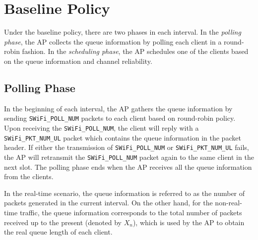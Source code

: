 \documentclass{article}
\begin{document}
\section{Baseline Policy}
\label{section: baseline}


\frenchspacing  Under the baseline policy, there are two phases in each interval. In the \emph{polling phase}, the AP collects the queue information by polling each client in a round-robin fashion. In the \emph{scheduling phase}, the AP schedules one of the clients based on the queue information and channel reliability.

\subsection{Polling Phase}
In the beginning of each interval, the AP gathers the queue information by sending \lstinline|SWiFi_POLL_NUM| packets to each client based on round-robin policy. Upon receiving the \lstinline|SWiFi_POLL_NUM|, the client will reply with a \lstinline|SWiFi_PKT_NUM_UL| packet which contains the queue information in the packet header. If either the transmission of \lstinline|SWiFi_POLL_NUM| or \lstinline|SWiFi_PKT_NUM_UL| fails, the AP will retransmit the \lstinline|SWiFi_POLL_NUM| packet again to the same client in the next slot. 
The polling phase ends when the AP receives all the queue information from the clients.

In the real-time scenario, the queue information is referred to as the number of packets generated in the current interval. On the other hand, for the non-real-time traffic, the queue information corresponds to the total number of packets received up to the present (denoted by $X_n$), which is used by the AP to obtain the real queue length of each client.    

\end{document}
